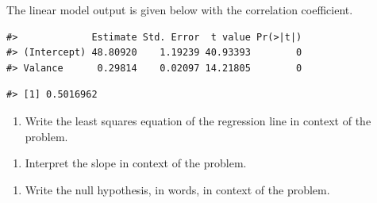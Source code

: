 \documentclass[
]{report}
\newenvironment{Shaded}{\begin{snugshade}}{\end{snugshade}}
\newcommand{\AttributeTok}[1]{\textcolor[rgb]{0.13,0.29,0.53}{#1}}
\newcommand{\CommentTok}[1]{\textcolor[rgb]{0.56,0.35,0.01}{\textit{#1}}}
\newcommand{\DecValTok}[1]{\textcolor[rgb]{0.00,0.00,0.81}{#1}}
\newcommand{\FunctionTok}[1]{\textcolor[rgb]{0.13,0.29,0.53}{\textbf{#1}}}
\newcommand{\NormalTok}[1]{#1}
\newcommand{\OtherTok}[1]{\textcolor[rgb]{0.56,0.35,0.01}{#1}}
\newcommand{\SpecialCharTok}[1]{\textcolor[rgb]{0.81,0.36,0.00}{\textbf{#1}}}
\providecommand{\tightlist}{%
  \setlength{\itemsep}{0pt}\setlength{\parskip}{0pt}}
\begin{document}
\newpage

The linear model output is given below with the correlation coefficient.

\begin{Shaded}
\end{Shaded}

\begin{verbatim}
#>             Estimate Std. Error  t value Pr(>|t|)
#> (Intercept) 48.80920    1.19239 40.93393        0
#> Valance      0.29814    0.02097 14.21805        0
\end{verbatim}

\begin{Shaded}
\end{Shaded}

\begin{verbatim}
#> [1] 0.5016962
\end{verbatim}

\begin{enumerate}
\def\labelenumi{\arabic{enumi}.}
\setcounter{enumi}{2}
\tightlist
\item
  Write the least squares equation of the regression line in context of the problem.
\end{enumerate}

\vspace{0.5in}

\begin{enumerate}
\def\labelenumi{\arabic{enumi}.}
\setcounter{enumi}{3}
\tightlist
\item
  Interpret the slope in context of the problem.
\end{enumerate}

\vspace{0.7in}

\begin{enumerate}
\def\labelenumi{\arabic{enumi}.}
\setcounter{enumi}{4}
\tightlist
\item
  Write the null hypothesis, in words, in context of the problem.
\end{enumerate}
\end{document}
